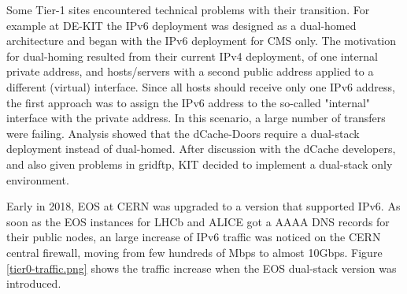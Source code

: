 Some Tier-1 sites encountered technical problems with their transition.
For example at DE-KIT the IPv6 deployment was designed as a dual-homed architecture
and began with the IPv6 deployment for 
CMS only. The motivation for dual-homing resulted from their current IPv4 deployment,
of one internal private address, and 
hosts/servers with a second public address applied to a different (virtual) interface. 
Since all hosts should receive only one IPv6 address, the first approach was to assign the IPv6 address to the so-called "internal" interface with the private address. 
In this scenario, a large number of transfers were failing. 
Analysis showed that the dCache-Doors require a dual-stack deployment instead of dual-homed. 
After discussion with the dCache developers, and also given problems in gridftp, KIT decided to implement a dual-stack only environment.
  
Early in 2018, EOS at CERN was upgraded to a version that supported IPv6.  
As soon as the EOS instances for LHCb and ALICE got a AAAA DNS records for their public nodes, an large increase of IPv6 traffic was noticed on the CERN central firewall, moving from few hundreds of Mbps to almost 10Gbps. 
Figure \ref{tier0-traffic.png} shows the traffic increase when the EOS dual-stack version was introduced.
 
